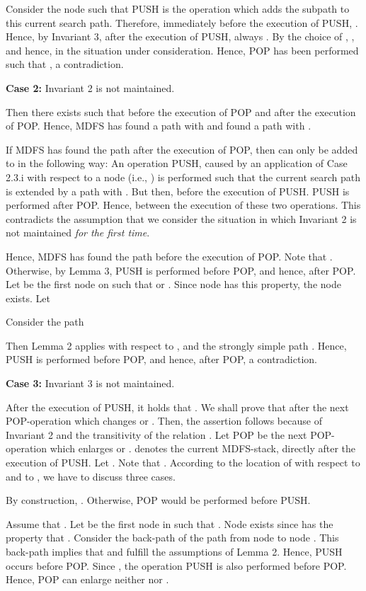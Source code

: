 \documentclass[12pt,twoside,a4paper]{article}
\begin{document}
Consider the node  such that PUSH is the operation which adds 
the subpath  to this current search path. Therefore, immediately before the execution
of PUSH, . Hence, by Invariant 3,
after the execution of PUSH, always . By
the choice of , , and hence,  in 
the situation under consideration. Hence, 
POP has been performed such that , a contradiction. 

\medskip
\noindent
{\bf Case 2:} Invariant 2 is not maintained.

\medskip
Then there exists  such that 
 before the execution of POP and 
  after the execution of POP.
Hence, MDFS has found a path  with  and 
found a path  with .

If MDFS has found the path  after the execution of POP, then
 can only be added to  in the following way:
An operation PUSH, caused by an application of Case 2.3.i
with respect to a node  (i.e., ) is performed 
such that the current search path is extended by a path 
with .
But then,  before the execution of PUSH. 
PUSH is performed after POP. Hence,  between the execution of these two operations.
This contradicts the assumption that we consider the situation in
which Invariant 2 is not maintained {\em for the first time\/}.

Hence, MDFS has found the path  before the execution of POP. 
Note that . Otherwise, by Lemma 3, 
PUSH is performed before POP, and hence,  after POP. 
Let  be the first node on  such that  or . Since node  has this property, the node  exists. Let 
   
Consider the path

Then Lemma 2 applies with respect to ,  and the
strongly simple path . Hence, PUSH is performed
before POP, and hence, 
after POP, a contradiction.

\medskip
\noindent 
{\bf Case 3:} Invariant 3 is not maintained.

\medskip
After the execution of PUSH, it holds that
. 
We shall prove that  after the next 
POP-operation which changes  or . Then, the assertion 
follows because of Invariant 2 and the transitivity of the relation .
Let POP be the next POP-operation which enlarges  or
.  denotes the current MDFS-stack, directly after the 
execution of PUSH. Let .
Note that .
According to the location of  with respect to  and to
, we have to discuss three cases.

By construction, . Otherwise, 
POP would be performed before PUSH.

Assume that . Let  be the first node 
in  such that 
. Node  exists since 
has the property that .
Consider the back-path of the path from node  to node . This 
back-path implies that  and  fulfill the assumptions of
Lemma 2. Hence, PUSH occurs before POP. Since , the operation PUSH is also performed before
POP. Hence, POP can enlarge neither  nor
. 
\end{document}
